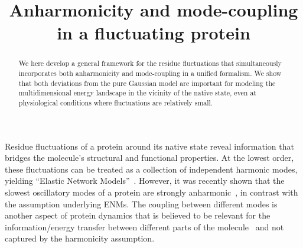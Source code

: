 \documentclass[prl,nofootinbib,twocolumn,floatfix,showpacs]{revtex4}
\begin{document}
\title{Anharmonicity and mode-coupling in a fluctuating protein}

\author{}


\begin{abstract}
We here develop a general framework for the residue
fluctuations that simultaneously incorporates both anharmonicity and
mode-coupling in a unified formalism. We show that both deviations
from the pure Gaussian model are important for modeling the
multidimensional energy landscape in the vicinity of the native state,
even at physiological conditions where fluctuations are relatively
small.

\end{abstract}


\maketitle

Residue fluctuations of a protein around its native state reveal
information that bridges the molecule's structural and functional
properties.  At the lowest order, these fluctuations can be treated as
a collection of independent harmonic modes, yielding ``Elastic Network
Models''~\cite{ENM}. However, it was recently shown that the slowest
oscillatory modes of a protein are strongly
anharmonic~\cite{Yogurtcu}, in contrast with the assumption underlying
ENMs. The coupling between different modes is another aspect of
protein dynamics that is believed to be relevant for the
information/energy transfer between different parts of the
molecule~\cite{mode_coupling_ref} and not captured by the harmonicity
assumption.
\end{document}
